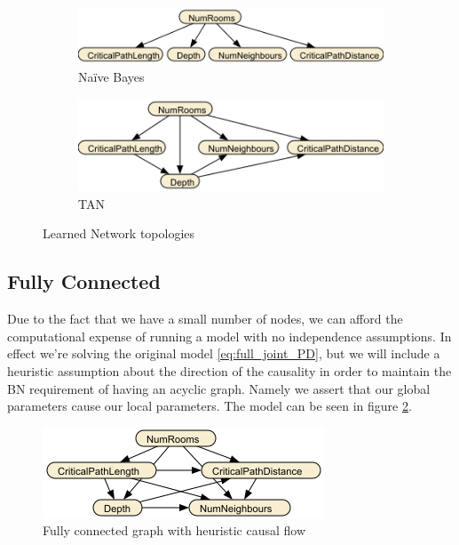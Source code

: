 \documentclass{UoYCSproject}
\begin{document}
\begin{figure}[htb]
  \centering
  \begin{subfigure}[b]{0.55\textwidth}
    \centering
    \includegraphics[width=\textwidth]{NBNet.png}
    \caption{Na\"{i}ve Bayes}
  \end{subfigure}
  \hfill
  \begin{subfigure}[b]{0.35\textwidth}
    \centering
    \includegraphics[width=\textwidth]{TANNet.png}
    \caption{TAN}
  \end{subfigure}
  \caption{Learned Network topologies}
  \label{fig:TAN}
\end{figure}


\subsection{Fully Connected}
Due to the fact that we have a small number of nodes, we can afford the computational expense of running a model with no independence assumptions. In effect we're solving the original model \ref{eq:full_joint_PD}, but we will include a heuristic assumption about the direction of the causality in order to maintain the BN requirement of having an acyclic graph. Namely we assert that our global parameters cause our local parameters. The model can be seen in figure \ref{fig:FullyConnected}.

\begin{figure}[htb]
  \centering
    \includegraphics[width=\textwidth]{FullyConnected.png}
    \caption{Fully connected graph with heuristic causal flow}
  \label{fig:FullyConnected}
\end{figure}
\end{document}
